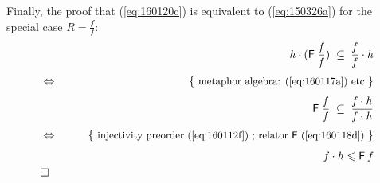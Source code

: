 \documentclass{elsarticle}
\newcommand{\Conid}[1]{\mathit{#1}}
\newcommand{\Varid}[1]{\mathit{#1}}
\renewcommand{\leq}{\leqslant}
\def\comp{ \mathbin{\cdot} }
\def\fun#1{\mathsf{#1}}
\def\just#1#2{\\ &#1& \rule{2em}{0pt} \{ \mbox{\rule[-.7em]{0pt}{1.8em} \small #2 \/} \} \nonumber\\ && }
\def\qed{\\&\Box&\nonumber}
\def\start{&&}
\def\equiv{\Leftrightarrow}
\begin{document}
Finally, the proof that (\ref{eq:160120c}) is equivalent to (\ref{eq:150326a}) for the special case \ensuremath{\Conid{R}\mathrel{=}\frac{\Varid{f}}{\Varid{f}}}:
\begin{eqnarray*}
\start
	\ensuremath{\Varid{h} \comp (\fun F \;\frac{\Varid{f}}{\Varid{f}})\; \subseteq \;\frac{\Varid{f}}{\Varid{f}} \comp \Varid{h}}	
%	
\just\equiv{ metaphor algebra: (\ref{eq:160117a}) etc }	
%	
	\ensuremath{\fun F \;\frac{\Varid{f}}{\Varid{f}}\; \subseteq \;\frac{\Varid{f} \comp \Varid{h}}{\Varid{f} \comp \Varid{h}}}	
%	
\just\equiv{ injectivity preorder (\ref{eq:160112f}) ; relator \ensuremath{\fun F } (\ref{eq:160118d}) }	
%	
	\ensuremath{\Varid{f} \comp \Varid{h}\leq \fun F \;\Varid{f}}	
\qed
\end{eqnarray*}
\end{document}
